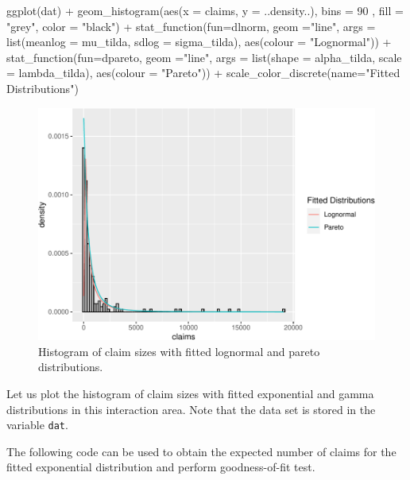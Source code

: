 \documentclass[landscape, 20pt]{extreport}
\newenvironment{Shaded}{\begin{snugshade}}{\end{snugshade}}
\newcommand{\AttributeTok}[1]{\textcolor[rgb]{0.77,0.63,0.00}{#1}}
\newcommand{\DecValTok}[1]{\textcolor[rgb]{0.00,0.00,0.81}{#1}}
\newcommand{\FunctionTok}[1]{\textcolor[rgb]{0.00,0.00,0.00}{#1}}
\newcommand{\NormalTok}[1]{#1}
\newcommand{\SpecialCharTok}[1]{\textcolor[rgb]{0.00,0.00,0.00}{#1}}
\newcommand{\StringTok}[1]{\textcolor[rgb]{0.31,0.60,0.02}{#1}}
\theoremstyle{definition}
\theoremstyle{definition}
\theoremstyle{definition}
\theoremstyle{definition}
\theoremstyle{remark}
\begin{document}
\begin{Shaded}
\begin{Highlighting}[]
\FunctionTok{ggplot}\NormalTok{(dat) }\SpecialCharTok{+} \FunctionTok{geom\_histogram}\NormalTok{(}\FunctionTok{aes}\NormalTok{(}\AttributeTok{x =}\NormalTok{ claims, }\AttributeTok{y =}\NormalTok{ ..density..), }\AttributeTok{bins =} \DecValTok{90}\NormalTok{ , }\AttributeTok{fill =} \StringTok{"grey"}\NormalTok{, }\AttributeTok{color =} \StringTok{"black"}\NormalTok{) }\SpecialCharTok{+} 
  \FunctionTok{stat\_function}\NormalTok{(}\AttributeTok{fun=}\NormalTok{dlnorm, }\AttributeTok{geom =}\StringTok{"line"}\NormalTok{, }\AttributeTok{args =} \FunctionTok{list}\NormalTok{(}\AttributeTok{meanlog =}\NormalTok{ mu\_tilda, }\AttributeTok{sdlog =}\NormalTok{ sigma\_tilda), }\FunctionTok{aes}\NormalTok{(}\AttributeTok{colour =} \StringTok{"Lognormal"}\NormalTok{)) }\SpecialCharTok{+} 
  \FunctionTok{stat\_function}\NormalTok{(}\AttributeTok{fun=}\NormalTok{dpareto, }\AttributeTok{geom =}\StringTok{"line"}\NormalTok{, }\AttributeTok{args =} \FunctionTok{list}\NormalTok{(}\AttributeTok{shape =}\NormalTok{ alpha\_tilda, }\AttributeTok{scale =}\NormalTok{ lambda\_tilda), }\FunctionTok{aes}\NormalTok{(}\AttributeTok{colour =} \StringTok{"Pareto"}\NormalTok{)) }\SpecialCharTok{+}
  \FunctionTok{scale\_color\_discrete}\NormalTok{(}\AttributeTok{name=}\StringTok{"Fitted Distributions"}\NormalTok{)}
\end{Highlighting}
\end{Shaded}

\begin{figure}
\centering
\includegraphics{FittedLognormalPareto-1.pdf}
\caption{\label{fig:FittedLognormalPareto}Histogram of claim sizes with fitted lognormal and pareto distributions.}
\end{figure}

Let us plot the histogram of claim sizes with fitted exponential and gamma distributions in this interaction area. Note that the data set is stored in the variable \texttt{dat}.


The following code can be used to obtain the expected number of claims for the fitted exponential distribution and perform goodness-of-fit test.
\end{document}
